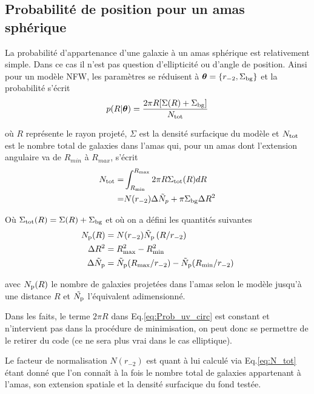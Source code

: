 \documentclass[a4paper,11pt]{article}
\numberwithin{equation}{section}
\begin{document}
    \subsection{Probabilité de position pour un amas sphérique}
    La probabilité d'appartenance d'une galaxie à un amas sphérique est relativement simple. Dans ce cas il n'est pas question d'ellipticité ou d'angle de position. Ainsi pour un modèle NFW, les paramètres se réduisent à $\bm{\theta} = \lbrace r_{-2} , \Sigma_{\rm{bg}} \rbrace$ et la probabilité s'écrit\cite{Mamon2010}
    \begin{equation}
      \label{eq:Prob_uv_circ}
      p(R | \bm{\theta}) =  \frac{2\pi R [ \Sigma (R) + \Sigma_{\rm{bg}} ]}{N_{\rm{tot}}}
    \end{equation}
    
    où $R$ représente le rayon projeté, $\Sigma$ est la densité surfacique du modèle et $N_{\rm{tot}}$ est le nombre total de galaxies dans l'amas qui, pour un amas dont l'extension angulaire va de $R_{min}$ à $R_{max}$, s'écrit
    \begin{equation}
      \begin{split}
        \label{eq:N_tot}
        N_{\rm{tot}} =  & \int_{R_{\rm{min}}}^{R_{\rm{max}}} 2 \pi R \Sigma_{\rm{tot}}(R) dR \\
                =  & N(r_{-2}) \Delta \tilde{N}_p + \pi \Sigma_{\rm{bg}} \Delta R^2
      \end{split}
    \end{equation}
    
    Où $\Sigma_{\rm{tot}}(R) = \Sigma (R) + \Sigma_{\rm{bg}}$ et où on a défini les quantités suivantes
      \begin{align*}
        N_{\rm{p}} (R) & = N(r_{-2}) \tilde{N}_{\rm{p}} \left ( R / r_{-2} \right ) \\
        \Delta R^2 & = R_{\rm{max}}^2 - R_{\rm{min}}^2 \\
        \Delta \tilde{N}_{\rm{p}} & = \tilde{N}_{\rm{p}} (R_{\rm{max}}/r_{-2}) - \tilde{N}_{\rm{p}} (R_{\rm{min}}/r_{-2})
      \end{align*}
      
	avec $N_{\rm{p}}(R)$ le nombre de galaxies projetées dans l'amas selon le modèle jusqu'à une distance $R$ et $\tilde{N_{\rm{p}}}$ l'équivalent adimensionné.
      
  Dans les faits, le terme $2\pi R$ dans Eq.\ref{eq:Prob_uv_circ} est constant et n'intervient pas dans la procédure de minimisation, on peut donc se permettre de le retirer du code (ce ne sera plus vrai dans le cas elliptique).\par
  Le facteur de normalisation $N(r_{-2})$ est quant à lui calculé via Eq.\ref{eq:N_tot} étant donné que l'on connaît à la fois le nombre total de galaxies appartenant à l'amas, son extension spatiale et la densité surfacique du fond testée.
\end{document}
